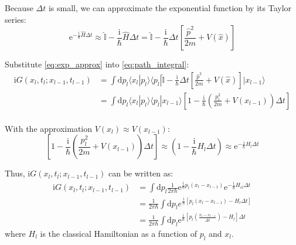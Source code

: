 Because $\Delta t$ is small, we can approximate the exponential function by its Taylor series:
\begin{equation}
    \label{eq:exp_approx}
    \mathrm{e}^{-\frac{\mathrm{i}}{\hbar}\hat{H}\Delta t} \approx \hat{\mathbb{I}} - \frac{\mathrm{i}}{\hbar}\hat{H}\Delta t 
    = \hat{\mathbb{I}} - \frac{\mathrm{i}}{\hbar}\Delta t \left[ \frac{\hat{p}^2}{2m} + V(\hat{x}) \right]
\end{equation}

Substitute \eqref{eq:exp_approx} into \eqref{eq:path_integral}:
\begin{equation}
\begin{aligned}
\mathrm{i}G(x_l, t_l; x_{l-1}, t_{l-1}) &= \int \mathrm{d}p_l \langle x_l | p_l \rangle \langle p_l | \hat{\mathbb{I}} - \frac{\mathrm{i}}{\hbar}\Delta t \left[ \frac{\hat{p}^2}{2m} + V(\hat{x}) \right] | x_{l-1} \rangle \\
&= \int \mathrm{d}p_l \langle x_l | p_l \rangle \langle p_l | x_{l-1} \rangle \left[ 1 - \frac{\mathrm{i}}{\hbar} \left( \frac{p_l^2}{2m} + V(x_{l-1}) \right) \Delta t \right] \\
\end{aligned}
\end{equation}

With the approximation $V(x_l) \approx V(x_{l-1})$:
\begin{equation}
\left[ 1 - \frac{\mathrm{i}}{\hbar} \left( \frac{p_l^2}{2m} + V(x_{l-1}) \right) \Delta t \right] 
\approx \left( 1 - \frac{\mathrm{i}}{\hbar} H_{l} \Delta t \right) \approx \mathrm{e}^{-\frac{\mathrm{i}}{\hbar}H_{l}\Delta t}
\end{equation}

Thus, $\mathrm{i}G(x_l, t_l; x_{l-1}, t_{l-1})$ can be written as:
\begin{equation}
    \begin{aligned}
    \mathrm{i}G(x_l, t_l; x_{l-1}, t_{l-1}) &= \int \mathrm{d}p_l \frac{1}{2\pi\hbar} \mathrm{e}^{\frac{\mathrm{i}}{\hbar}p_l(x_l-x_{l-1})} \mathrm{e}^{-\frac{\mathrm{i}}{\hbar}H_{cl}\Delta t} \\
    &= \frac{1}{2\pi\hbar} \int \mathrm{d}p_l e^{\frac{\mathrm{i}}{\hbar}[p_l(x_l-x_{l-1})-H_{l}\Delta t]} \\
    &= \frac{1}{2\pi\hbar} \int \mathrm{d}p_l \mathrm{e}^{\frac{\mathrm{i}}{\hbar}[p_l(\frac{x_l-x_{l-1}}{\Delta t})-H_{l}]\Delta t}
    \end{aligned}
\end{equation}
where $H_l$ is the classical Hamiltonian as a function of $p_l$ and $x_l$.

